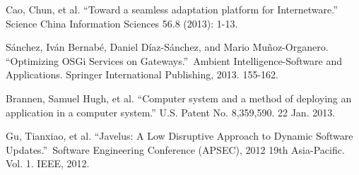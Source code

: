 \documentclass[conference]{IEEEtran}
\begin{document}
\begin{thebibliography}{9}
Cao, Chun, et al. ``Toward a seamless adaptation platform for Internetware.'' Science China Information Sciences 56.8 (2013): 1-13.

Sánchez, Iván Bernabé, Daniel Díaz-Sánchez, and Mario Muñoz-Organero. ``Optimizing OSGi Services on Gateways.'' Ambient Intelligence-Software and Applications. Springer International Publishing, 2013. 155-162.

Brannen, Samuel Hugh, et al. ``Computer system and a method of deploying an application in a computer system.'' U.S. Patent No. 8,359,590. 22 Jan. 2013.

Gu, Tianxiao, et al. ``Javelus: A Low Disruptive Approach to Dynamic Software Updates.'' Software Engineering Conference (APSEC), 2012 19th Asia-Pacific. Vol. 1. IEEE, 2012.

\end{thebibliography}


\end{document}
